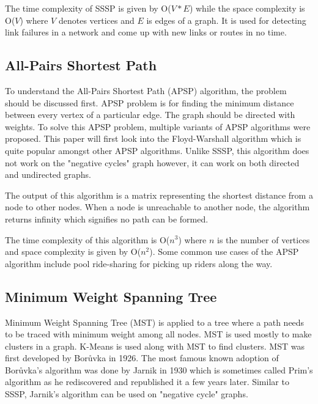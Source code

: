 \documentclass[journal,twoside,web]{ieeecolor}
\begin{document}
The time complexity of SSSP is given by O($V*E$) while the space complexity is O($V$) where $V$ denotes vertices and $E$ is edges of a graph. It is used for detecting link failures in a network and come up with new links or routes in no time.

\subsection{All-Pairs Shortest Path}
To understand the All-Pairs Shortest Path (APSP) algorithm, the problem should be discussed first. APSP problem is for finding the minimum distance between every vertex of a particular edge. The graph should be directed with weights. To solve this APSP problem, multiple variants of APSP algorithms were proposed\cite{43, 44, 45, 46}. This paper will first look into the Floyd-Warshall algorithm which is quite popular amongst other APSP algorithms. Unlike SSSP, this algorithm does not work on the "negative cycles" graph however, it can work on both directed and undirected graphs.

The output of this algorithm is a matrix representing the shortest distance from a node to other nodes. When a node is unreachable to another node, the algorithm returns infinity which signifies no path can be formed.

The time complexity of this algorithm is O($n^3$) where $n$ is the number of vertices and space complexity is given by O($n^2$). Some common use cases of the APSP algorithm include pool ride-sharing for picking up riders along the way.

\subsection{Minimum Weight Spanning Tree}
Minimum Weight Spanning Tree (MST) is applied to a tree where a path needs to be traced with minimum weight among all nodes. MST is used mostly to make clusters in a graph. K-Means is used along with MST to find clusters. MST was first developed by Borůvka in 1926\cite{47}. The most famous known adoption of Borůvka's algorithm was done by Jarnik in 1930\cite{48} which is sometimes called Prim's algorithm as he rediscovered and republished it a few years later\cite{49}. Similar to SSSP, Jarnik's algorithm can be used on "negative cycle" graphs.
\end{document}
